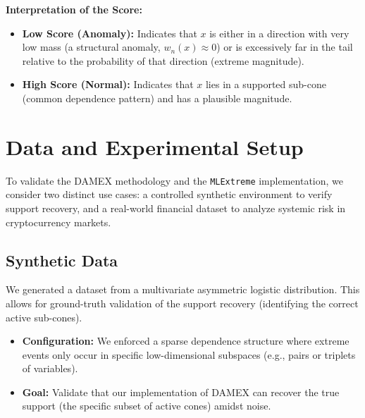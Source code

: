 \documentclass[11pt]{article}
\begin{document}
\textbf{Interpretation of the Score:}
\begin{itemize}
    \item \textbf{Low Score (Anomaly):} Indicates that $x$ is either in a direction with very low mass (a structural anomaly, $w_n(x) \approx 0$) or is excessively far in the tail relative to the probability of that direction (extreme magnitude).
    \item \textbf{High Score (Normal):} Indicates that $x$ lies in a supported sub-cone (common dependence pattern) and has a plausible magnitude.
\end{itemize}


\section{Data and Experimental Setup}
To validate the DAMEX methodology and the \texttt{MLExtreme} implementation, we consider two distinct use cases: a controlled synthetic environment to verify support recovery, and a real-world financial dataset to analyze systemic risk in cryptocurrency markets.

\subsection{Synthetic Data}
We generated a dataset from a multivariate asymmetric logistic distribution. This allows for ground-truth validation of the support recovery (identifying the correct active sub-cones).
\begin{itemize}
    \item \textbf{Configuration:} We enforced a sparse dependence structure where extreme events only occur in specific low-dimensional subspaces (e.g., pairs or triplets of variables).
    \item \textbf{Goal:} Validate that our implementation of DAMEX can recover the true support (the specific subset of active cones) amidst noise.
\end{itemize}
\end{document}
